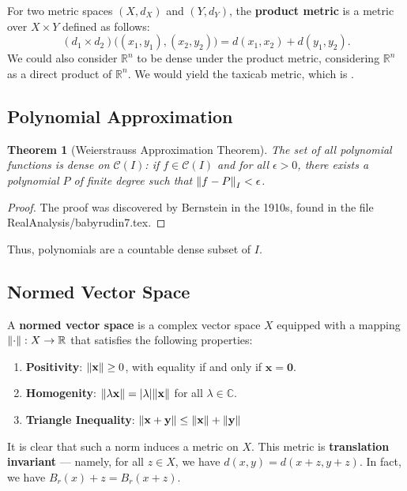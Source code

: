 \documentclass[11pt]{article}
\newtheorem{theorem}{Theorem}
\renewcommand{\vec}[1]{\mathbf{#1}}
\begin{document}
For two metric spaces $(X, d_{X})$ and $(Y, d_{Y})$, the \textbf{product metric} is a metric over $X \times Y$ defined as follows:
\[
	(d_{1} \times d_{2})\big((x_{1}, y_{1}), (x_{2}, y_{2})\big) = d(x_{1}, x_{2}) + d(y_{1}, y_{2}).
\]
We could also consider $\mathbb{R}^{n}$ to be dense under the product metric, considering $\mathbb{R}^{n}$ as a direct product of $\mathbb{R}^{n}$. We would yield the taxicab metric, which is .


\subsection{Polynomial Approximation}

\begin{theorem}[Weierstrauss Approximation Theorem]
  The set of all polynomial functions is dense on $\mathcal{C}(I)$: if $f \in \mathcal{C}(I)$ and for all $\epsilon > 0$, there exists a polynomial $P$ of finite degree such that $\norm{f - P}_{I} < \epsilon$.
\end{theorem}
\begin{adjustwidth}{0.5cm}{}
  \begin{proof}
    The proof was discovered by Bernstein in the 1910s, found in the file RealAnalysis/babyrudin7.tex.
  \end{proof}
\end{adjustwidth}

Thus, polynomials are a countable dense subset of $I$.


\subsection{Normed Vector Space}

A \textbf{normed vector space} is a complex vector space $X$ equipped with a mapping $\norm{\cdot} : X \to \mathbb{R}$ that satisfies the following properties:
\begin{enumerate}
	\item \textbf{Positivity}: $\norm{\vec{x}} \ge 0$, with equality if and only if $\vec{x} = \vec{0}$.
	\item \textbf{Homogenity}: $\norm{\lambda \vec{x}} = \abs{\lambda} \norm{\vec{x}}$ for all $\lambda \in \mathbb{C}$.
  \item \textbf{Triangle Inequality}: $\norm{\vec{x} + \vec{y}} \le \norm{\vec{x}} + \norm{\vec{y}}$
\end{enumerate}
It is clear that such a norm induces a metric on $X$. This metric is \textbf{translation invariant} --- namely, for all $z \in X$, we have $d(x, y) = d(x + z, y + z)$. In fact, we have $B_{r}(x) + z = B_{r}(x + z)$.
\end{document}
